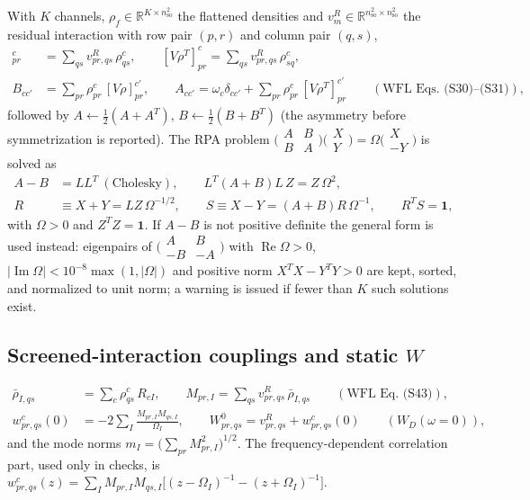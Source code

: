 \documentclass[11pt,a4paper]{article}
\newcommand{\vR}{v^{R}}
\newcommand{\so}{\mathrm{so}}
\begin{document}
With $K$ channels, $\rho_f\in\mathbb R^{K\times n_{\so}^2}$ the flattened
densities and $\vR_m\in\mathbb R^{n_{\so}^2\times n_{\so}^2}$ the residual
interaction with row pair $(p,r)$ and column pair $(q,s)$,
\begin{align}
  [V\rho]^{c}_{pr}&=\sum_{qs}\vR_{pr,qs}\,\rho^{c}_{qs},\qquad
  [V\rho^{T}]^{c}_{pr}=\sum_{qs}\vR_{pr,qs}\,\rho^{c}_{sq},\\
  B_{cc'}&=\sum_{pr}\rho^{c}_{pr}\,[V\rho]^{c'}_{pr},\qquad
  A_{cc'}=\omega_c\delta_{cc'}+\sum_{pr}\rho^{c}_{pr}\,[V\rho^{T}]^{c'}_{pr}
  \qquad(\text{WFL Eqs.~(S30)--(S31)}),
  \label{eq:AB}
\end{align}
followed by $A\leftarrow\tfrac12(A+A^{T})$, $B\leftarrow\tfrac12(B+B^{T})$
(the asymmetry before symmetrization is reported).  The RPA problem
$\bigl(\begin{smallmatrix}A&B\\B&A\end{smallmatrix}\bigr)\bigl(\begin{smallmatrix}X\\Y\end{smallmatrix}\bigr)
=\Omega\bigl(\begin{smallmatrix}X\\-Y\end{smallmatrix}\bigr)$ is solved as
\begin{align}
  A-B&=LL^{T}\ (\text{Cholesky}),\qquad
  L^{T}(A+B)L\,Z=Z\,\Omega^{2},
  \label{eq:rpa}\\
  R&\equiv X+Y=LZ\,\Omega^{-1/2},\qquad
  S\equiv X-Y=(A+B)R\,\Omega^{-1},\qquad R^{T}S=\mathbf 1 ,\nonumber
\end{align}
with $\Omega>0$ and $Z^{T}Z=\mathbf 1$.  If $A-B$ is not positive definite
the general form is used instead: eigenpairs of
$\bigl(\begin{smallmatrix}A&B\\-B&-A\end{smallmatrix}\bigr)$ with
$\operatorname{Re}\Omega>0$, $|\operatorname{Im}\Omega|<10^{-8}\max(1,|\Omega|)$
and positive norm $X^{T}X-Y^{T}Y>0$ are kept, sorted, and normalized to
unit norm; a warning is issued if fewer than $K$ such solutions exist.

\subsection{Screened-interaction couplings and static $W$}

\begin{align}
  \bar\rho_{I,qs}&=\sum_c\rho^{c}_{qs}\,R_{cI},\qquad
  M_{pr,I}=\sum_{qs}\vR_{pr,qs}\,\bar\rho_{I,qs}\qquad(\text{WFL Eq.~(S43)}),
  \label{eq:M}\\
  w^{c}_{pr,qs}(0)&=-2\sum_I\frac{M_{pr,I}M_{qs,I}}{\Omega_I},\qquad
  W^{0}_{pr,qs}=\vR_{pr,qs}+w^{c}_{pr,qs}(0)\qquad(W_D(\omega=0)),
  \label{eq:W0}
\end{align}
and the mode norms $m_I=\bigl(\sum_{pr}M_{pr,I}^2\bigr)^{1/2}$.  The
frequency-dependent correlation part, used only in checks, is
$w^{c}_{pr,qs}(z)=\sum_IM_{pr,I}M_{qs,I}\bigl[(z-\Omega_I)^{-1}-(z+\Omega_I)^{-1}\bigr]$.
\end{document}
